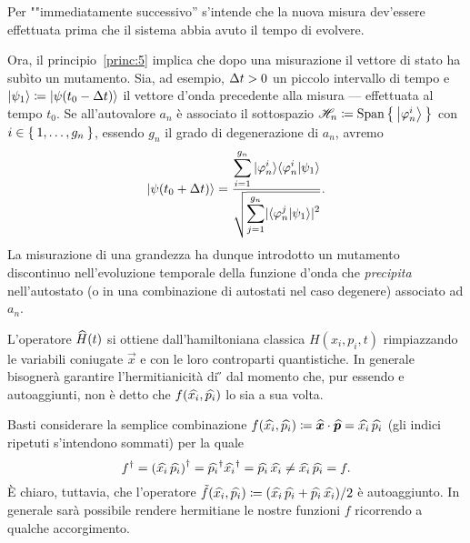 
\noindent
Per ""immediatamente successivo'' s'intende che la nuova misura dev'essere effettuata prima che il sistema abbia avuto il tempo di evolvere.


Ora, il principio~\ref{princ:5} implica che dopo una misurazione il vettore di stato ha subìto un mutamento.
Sia, ad esempio, $\mathop{}\!\Delta t>0$ un piccolo intervallo di tempo e $\ket{\psi_1}\coloneqq\ket{\psi(t_0-\mathop{}\!\Delta t)}$ il vettore d'onda precedente alla misura --- effettuata al tempo $t_0$.
Se all'autovalore $a_n$ è associato il sottospazio $\mathscr{H}_n\coloneqq \operatorname{Span}\Set{ \Ket{\varphi_n^i} }$ con $i\in\Set{1,\dots,g_n}$, essendo $g_n$ il grado di degenerazione di $a_n$, avremo
\begin{equation}
\ket{\psi(t_0+\uD t)}=
\frac{\displaystyle \sum_{i=1}^{g_n}\ket{\varphi_n^i}\!\braket{\varphi_n^i|\psi_1}}%
{\sqrt{\displaystyle \sum_{j=1}^{g_n}\abs{\braket{\varphi_n^j|\psi_1}}^2}}.%
\end{equation}
La misurazione di una grandezza ha dunque introdotto un mutamento discontinuo nell'evoluzione temporale della funzione d'onda che \emph{precipita} nell'autostato (o in una combinazione di autostati nel caso degenere) associato ad $a_n$.


\noindent
L'operatore $\widehat{H}(t)$ si ottiene dall'hamiltoniana classica $H(x_i,p_i,t)$ rimpiazzando le variabili coniugate $\vec{x}$ e  con le loro controparti quantistiche.
In generale bisognerà garantire l'hermitianicità di \H{} dal momento che, pur essendo  e  autoaggiunti, non è detto che $f(\widehat{x_i},\widehat{p_i})$ lo sia a sua volta.


Basti considerare la semplice combinazione $f(\widehat{x_i},\widehat{p_i})\coloneqq\bm{{\widehat{x}}}\cdot\bm{{\widehat{p}}}=\widehat{x_i}\,\widehat{p_i}$ (gli indici ripetuti s'intendono sommati) per la quale
\begin{equation}
{f}^\dag={(\widehat{x_i}\,\widehat{p_i})}^\dag={\widehat{p_i}}^\dag{\ensuremath{\widehat{x_i}}}^\dag=\widehat{p_i}\,\widehat{x_i}\neq\widehat{x_i}\,\widehat{p_i}=f.
\end{equation}
È chiaro, tuttavia, che l'operatore $\tilde{f}(\widehat{x_i},\widehat{p_i})\coloneqq(\widehat{x_i}\,\widehat{p_i}+\widehat{p_i}\,\widehat{x_i})/2$ è autoaggiunto.
In generale sarà possibile rendere hermitiane le nostre funzioni $f$ ricorrendo a qualche accorgimento.


